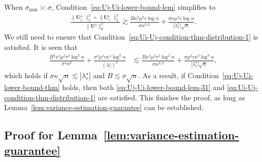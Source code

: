 When $\sigma_{\min}\asymp \sigma$, Condition~\eqref{eq:Uj-Ui-lower-bound-lem} simplifies to
%
\begin{align}
	\frac{\big\|\bm{U}_{j,\cdot}^{\star}\big\|_{2}^{2}+\big\|\bm{U}_{i,\cdot}^{\star}\big\|_{2}^{2}}{\big\|\bm{U}^{\star}\big\|_{\mathrm{F}}^{2}}
	\gtrsim\frac{B\kappa^{2}\mu^{2}r\log n}{\sigma n^{3/2}}+\frac{\sigma\kappa\mu^{2}r\log n}{|\lambda_{r}^{\star}|\sqrt{n}}.		 
		\label{eq:Uj-Ui-lower-bound-lem-31}
\end{align}
%
We still need to ensure that Condition~\eqref{eq:Ui-Uj-condition-thm-distribution-1} is satisfied.  
It is seen that 
%
\begin{align*}
	\frac{B^{2}\kappa^{2}\mu^{2}r^{2}\log^{2}n}{\sigma^{2}n^{2}}+\frac{\sigma^{2}\mu^{2}r\kappa^{4}\log^{3}n}{(\lambda_{r}^{\star})^{2}}&\lesssim\frac{B\kappa^{2}\mu^{2}r^{2}\log^{2}n}{\sigma n^{3/2}}+\frac{\sigma\mu^{2}r\kappa^{3}\log^{3}n}{|\lambda_{r}^{\star}|\sqrt{n}},
\end{align*}
%
which holds if $\sigma\kappa \sqrt{n} \lesssim |\lambda_r^{\star}|$ and $B\lesssim \sigma\sqrt{n}$. 
As a result, if Condition~\eqref{eq:Uj-Ui-lower-bound-thm} holds, then both \eqref{eq:Uj-Ui-lower-bound-lem-31} and \eqref{eq:Ui-Uj-condition-thm-distribution-1}
are satisfied. 
This finishes the proof, as long as  Lemma~\ref{lem:variance-estimation-guarantee} can be established. 





\subsection{Proof for Lemma~\ref{lem:variance-estimation-guarantee}}
\label{sec:proof-lem:variance-estimation-guarantee}

